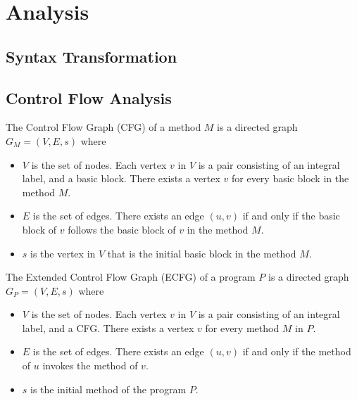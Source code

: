 \section{Analysis}

\subsection{Syntax Transformation}

\subsection{Control Flow Analysis}

\begin{definition}
\end{definition}

\begin{definition}
The Control Flow Graph (CFG) of a method $M$ is a directed graph $G_M=(V,E,s)$
where
\begin{itemize}
    \item $V$ is the set of nodes. Each vertex $v$ in $V$ is a pair consisting
    of an integral label, and a basic block. There exists a vertex $v$ for every 
    basic block in the method $M$.
    \item $E$ is the set of edges. There exists an edge $(u,v)$ if and only if 
    the basic block of $v$ follows the basic block of $v$ in the method $M$.
    \item $s$ is the vertex in $V$ that is the initial basic block in the method 
    $M$.
\end{itemize}
\end{definition}

\begin{definition}
The Extended Control Flow Graph (ECFG) of a program $P$ is a directed graph 
$G_P=(V,E,s)$ where
\begin{itemize}
    \item $V$ is the set of nodes. Each vertex $v$ in $V$ is a pair consisting
    of an integral label, and a CFG. There exists a vertex $v$ for every method 
    $M$ in $P$.
    \item $E$ is the set of edges. There exists an edge $(u,v)$ if and only if 
    the method of $u$ invokes the method of $v$.
    \item $s$ is the initial method of the program $P$.
\end{itemize}
\end{definition}

